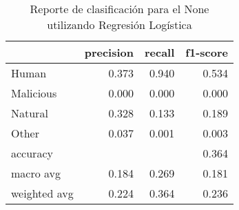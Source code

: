 \begin{table}
\centering
\caption{Reporte de clasificación para el None utilizando Regresión Logística}
\label{tab:RL_None}
\begin{tabular}{lrrr}
\toprule
{} &  precision &  recall &  f1-score \\
\midrule
Human        &      0.373 &   0.940 &     0.534 \\
Malicious    &      0.000 &   0.000 &     0.000 \\
Natural      &      0.328 &   0.133 &     0.189 \\
Other        &      0.037 &   0.001 &     0.003 \\
accuracy     &            &         &     0.364 \\
macro avg    &      0.184 &   0.269 &     0.181 \\
weighted avg &      0.224 &   0.364 &     0.236 \\
\bottomrule
\end{tabular}
\end{table}
